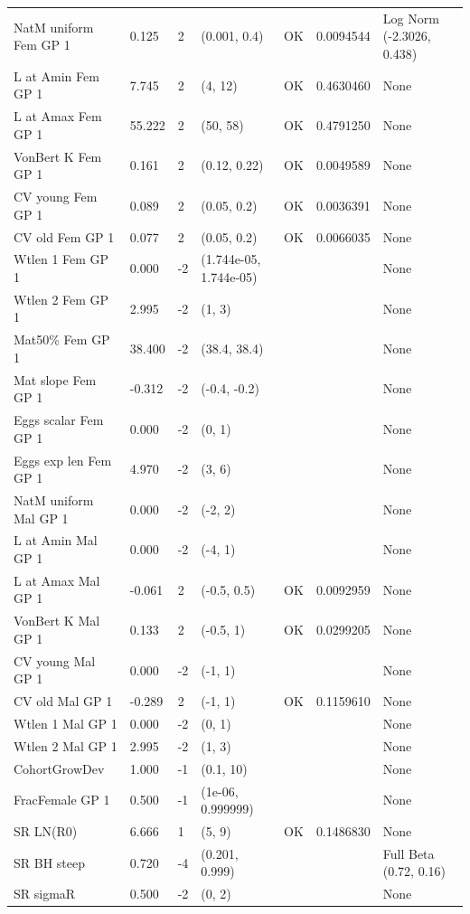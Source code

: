 \documentclass[
  english,
  a4paper,
]{article}
\begin{document}
\begin{landscape}
\begin{longtable}[t]{>{\raggedright\arraybackslash}p{8.5cm}lllll>{\raggedright\arraybackslash}p{4cm}}
\endfoot
\bottomrule
\endlastfoot
NatM uniform Fem GP 1 & 0.125 & 2 & (0.001, 0.4) & OK & 0.0094544 & Log Norm (-2.3026, 0.438)\\
L at Amin Fem GP 1 & 7.745 & 2 & (4, 12) & OK & 0.4630460 & None\\
L at Amax Fem GP 1 & 55.222 & 2 & (50, 58) & OK & 0.4791250 & None\\
VonBert K Fem GP 1 & 0.161 & 2 & (0.12, 0.22) & OK & 0.0049589 & None\\
CV young Fem GP 1 & 0.089 & 2 & (0.05, 0.2) & OK & 0.0036391 & None\\
CV old Fem GP 1 & 0.077 & 2 & (0.05, 0.2) & OK & 0.0066035 & None\\
Wtlen 1 Fem GP 1 & 0.000 & -2 & (1.744e-05, 1.744e-05) &  &  & None\\
Wtlen 2 Fem GP 1 & 2.995 & -2 & (1, 3) &  &  & None\\
Mat50\% Fem GP 1 & 38.400 & -2 & (38.4, 38.4) &  &  & None\\
Mat slope Fem GP 1 & -0.312 & -2 & (-0.4, -0.2) &  &  & None\\
Eggs scalar Fem GP 1 & 0.000 & -2 & (0, 1) &  &  & None\\
Eggs exp len Fem GP 1 & 4.970 & -2 & (3, 6) &  &  & None\\
NatM uniform Mal GP 1 & 0.000 & -2 & (-2, 2) &  &  & None\\
L at Amin Mal GP 1 & 0.000 & -2 & (-4, 1) &  &  & None\\
L at Amax Mal GP 1 & -0.061 & 2 & (-0.5, 0.5) & OK & 0.0092959 & None\\
VonBert K Mal GP 1 & 0.133 & 2 & (-0.5, 1) & OK & 0.0299205 & None\\
CV young Mal GP 1 & 0.000 & -2 & (-1, 1) &  &  & None\\
CV old Mal GP 1 & -0.289 & 2 & (-1, 1) & OK & 0.1159610 & None\\
Wtlen 1 Mal GP 1 & 0.000 & -2 & (0, 1) &  &  & None\\
Wtlen 2 Mal GP 1 & 2.995 & -2 & (1, 3) &  &  & None\\
CohortGrowDev & 1.000 & -1 & (0.1, 10) &  &  & None\\
FracFemale GP 1 & 0.500 & -1 & (1e-06, 0.999999) &  &  & None\\
SR LN(R0) & 6.666 & 1 & (5, 9) & OK & 0.1486830 & None\\
SR BH steep & 0.720 & -4 & (0.201, 0.999) &  &  & Full Beta (0.72, 0.16)\\
SR sigmaR & 0.500 & -2 & (0, 2) &  &  & None\\

\end{longtable}
\end{landscape}
\end{document}
